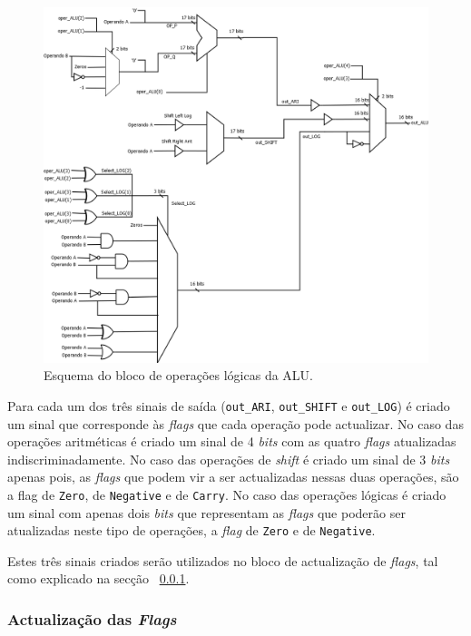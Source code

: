 \documentclass[11pt]{article}
\numberwithin{equation}{section}
\begin{document}
\begin{figure}[H]
	\centering
	\includegraphics[keepaspectratio=true, scale=0.40]{imagens/ALU}
	\caption{Esquema do bloco de operações lógicas da ALU.}
	\vspace{-0.8em}
	\label{fig:ALU}
\end{figure}

Para cada um dos três sinais de saída (\texttt{out\_ARI}, \texttt{out\_SHIFT} e \texttt{out\_LOG}) é criado um sinal que corresponde às \textit{flags} que cada operação pode actualizar. No caso das operações aritméticas é criado um sinal de 4 \textit{bits} com as quatro \textit{flags} atualizadas indiscriminadamente. No caso das operações de \textit{shift} é criado um sinal de 3 \textit{bits} apenas pois, as \textit{flags} que podem vir a ser actualizadas nessas duas operações, são a flag de \texttt{Zero}, de \texttt{Negative} e de \texttt{Carry}. No caso das operações lógicas é criado um sinal com apenas dois \textit{bits} que representam as \textit{flags} que poderão ser atualizadas neste tipo de operações, a \textit{flag} de \texttt{Zero} e de \texttt{Negative}.

Estes três sinais criados serão utilizados no bloco de actualização de \textit{flags}, tal como explicado na secção ~\ref{subsec:act-flags}.

\subsubsection{Actualização das \textit{Flags}}
\label{subsec:act-flags}
\end{document}

